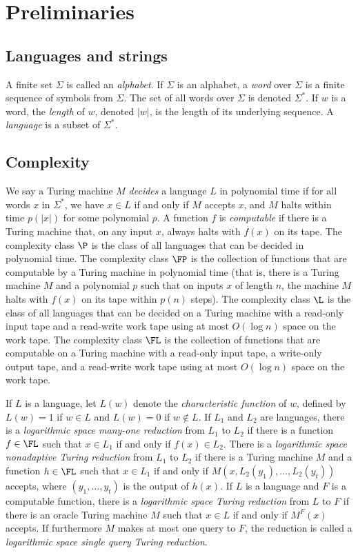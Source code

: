 \documentclass{article}
\begin{document}
\section{Preliminaries}

\subsection{Languages and strings}

A finite set $\Sigma$ is called an \emph{alphabet}.
If $\Sigma$ is an alphabet, a \emph{word} over $\Sigma$ is a finite sequence of symbols from $\Sigma$.
The set of all words over $\Sigma$ is denoted $\Sigma^*$.
If $w$ is a word, the \emph{length} of $w$, denoted $|w|$, is the length of its underlying sequence.
A \emph{language} is a subset of $\Sigma^*$.

\subsection{Complexity}

We say a Turing machine $M$ \emph{decides} a language $L$ in polynomial time if for all words $x$ in $\Sigma^*$, we have $x \in L$ if and only if $M$ accepts $x$, and $M$ halts within time $p(|x|)$ for some polynomial $p$.
A function $f$ is \emph{computable} if there is a Turing machine that, on any input $x$, always halts with $f(x)$ on its tape.
The complexity class $\P$ is the class of all languages that can be decided in polynomial time.
The complexity class $\FP$ is the collection of functions that are computable by a Turing machine in polynomial time (that is, there is a Turing machine $M$ and a polynomial $p$ such that on inputs $x$ of length $n$, the machine $M$ halts with $f(x)$ on its tape within $p(n)$ steps).
The complexity class $\L$ is the class of all languages that can be decided on a Turing machine with a read-only input tape and a read-write work tape using at most $O(\log n)$ space on the work tape.
The complexity class $\FL$ is the collection of functions that are computable on a Turing machine with a read-only input tape, a write-only output tape, and a read-write work tape using at most $O(\log n)$ space on the work tape.

If $L$ is a language, let $L(w)$ denote the \emph{characteristic function} of $w$, defined by $L(w) = 1$ if $w \in L$ and $L(w) = 0$ if $w \notin L$.
If $L_1$ and $L_2$ are languages, there is a \emph{logarithmic space many-one reduction} from $L_1$ to $L_2$ if there is a function $f \in \FL$ such that $x \in L_1$ if and only if $f(x) \in L_2$.
There is a \emph{logarithmic space nonadaptive Turing reduction} from $L_1$ to $L_2$ if there is a Turing machine $M$ and a function $h \in \FL$ such that $x \in L_1$ if and only if $M(x, L_2(y_1), \dotsc, L_2(y_t))$ accepts, where $(y_1, \dotsc, y_t)$ is the output of $h(x)$.
If $L$ is a language and $F$ is a computable function, there is a \emph{logarithmic space Turing reduction} from $L$ to $F$ if there is an oracle Turing machine $M$ such that $x \in L$ if and only if $M^F(x)$ accepts.
If furthermore $M$ makes at most one query to $F$, the reduction is called a \emph{logarithmic space single query Turing reduction}.
\end{document}
